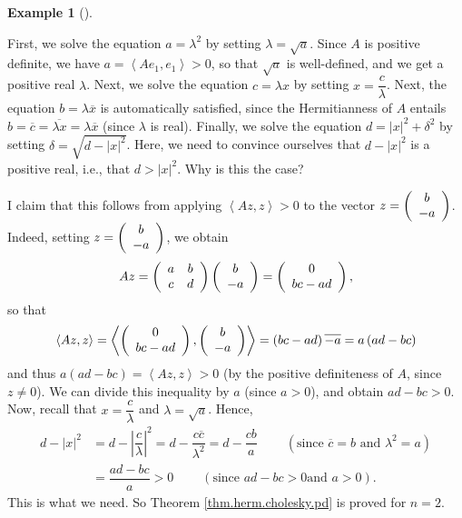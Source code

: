 \documentclass[numbers=enddot,12pt,final,onecolumn,notitlepage]{scrartcl}%
\numberwithin{exer}{subsection}
\theoremstyle{definition}
\newtheorem{exam}[theo]{Example}
\newenvironment{example}[1][]
{\begin{exam}[#1]\begin{leftbar}}
{\end{leftbar}\end{exam}}
\begin{document}
\begin{example}
First, we solve the equation $a=\lambda^{2}$ by setting $\lambda=\sqrt{a}$.
Since $A$ is positive definite, we have $a=\left\langle Ae_{1},e_{1}%
\right\rangle >0$, so that $\sqrt{a}$ is well-defined, and we get a positive
real $\lambda$. Next, we solve the equation $c=\lambda x$ by setting
$x=\dfrac{c}{\lambda}$. Next, the equation $b=\lambda\overline{x}$ is
automatically satisfied, since the Hermitianness of $A$ entails $b=\overline
{c}=\overline{\lambda x}=\lambda\overline{x}$ (since $\lambda$ is real).
Finally, we solve the equation $d=\left\vert x\right\vert ^{2}+\delta^{2}$ by
setting $\delta=\sqrt{d-\left\vert x\right\vert ^{2}}$. Here, we need to
convince ourselves that $d-\left\vert x\right\vert ^{2}$ is a positive real,
i.e., that $d>\left\vert x\right\vert ^{2}$. Why is this the case?

I claim that this follows from applying $\left\langle Az,z\right\rangle >0$ to
the vector $z=\left(
\begin{array}
[c]{c}%
b\\
-a
\end{array}
\right)  $. Indeed, setting $z=\left(
\begin{array}
[c]{c}%
b\\
-a
\end{array}
\right)  $, we obtain%
\[
Az=\left(
\begin{array}
[c]{cc}%
a & b\\
c & d
\end{array}
\right)  \left(
\begin{array}
[c]{c}%
b\\
-a
\end{array}
\right)  =\left(
\begin{array}
[c]{c}%
0\\
bc-ad
\end{array}
\right)  ,
\]
so that%
\[
\left\langle Az,z\right\rangle =\left\langle \left(
\begin{array}
[c]{c}%
0\\
bc-ad
\end{array}
\right)  ,\left(
\begin{array}
[c]{c}%
b\\
-a
\end{array}
\right)  \right\rangle =\left(  bc-ad\right)  \overline{-a}=a\left(
ad-bc\right)
\]
and thus $a\left(  ad-bc\right)  =\left\langle Az,z\right\rangle >0$ (by the
positive definiteness of $A$, since $z\neq0$). We can divide this inequality
by $a$ (since $a>0$), and obtain $ad-bc>0$. Now, recall that $x=\dfrac
{c}{\lambda}$ and $\lambda=\sqrt{a}$. Hence,%
\begin{align*}
d-\left\vert x\right\vert ^{2} &  =d-\left\vert \dfrac{c}{\lambda}\right\vert
^{2}=d-\dfrac{c\overline{c}}{\lambda^{2}}=d-\dfrac{cb}{a}%
\ \ \ \ \ \ \ \ \ \ \left(  \text{since }\overline{c}=b\text{ and }\lambda
^{2}=a\right)  \\
&  =\dfrac{ad-bc}{a}>0\ \ \ \ \ \ \ \ \ \ \left(  \text{since }ad-bc>0\text{
and }a>0\right)  .
\end{align*}
This is what we need. So Theorem \ref{thm.herm.cholesky.pd} is proved for
$n=2$.
\end{example}
\end{document}
